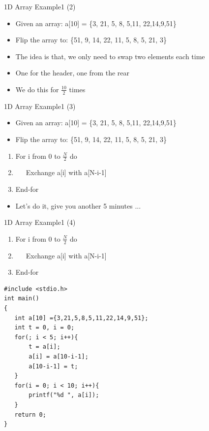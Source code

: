 \begin{frame}{1D Array Example1 (2)}
	\begin{itemize}
		\item {Given an array: a[10] = \{3, 21, 5, 8, 5,11, 22,14,9,51\}}
		\item {Flip the array to: \{51, 9, 14, 22, 11, 5, 8, 5, 21, 3\}}
	\end{itemize}
	\begin{itemize}
		\item {The idea is that, we only need to swap two elements each time}
		\item {One for the header, one from the rear}
		\item {We do this for $\frac{10}{2}$ times}
	\end{itemize}
\end{frame}

\begin{frame}{1D Array Example1 (3)}
	\begin{itemize}
		\item {Given an array: a[10] = \{3, 21, 5, 8, 5,11, 22,14,9,51\}}
		\item {Flip the array to: \{51, 9, 14, 22, 11, 5, 8, 5, 21, 3\}}
	\end{itemize}
	\begin{enumerate}
		\item {For i from 0 to $\frac{N}{2}$ do}
		\item {~~~Exchange a[i] with a[N-i-1]}
		\item {End-for}
	\end{enumerate}
	\begin{itemize}
		\item {Let's do it, give you another 5 minutes ...}
	\end{itemize}
\end{frame}

\begin{frame}[fragile]{1D Array Example1 (4)}
	\begin{enumerate}
		\item {For i from 0 to $\frac{N}{2}$ do}
		\item {~~~Exchange a[i] with a[N-i-1]}
		\item {End-for}
	\end{enumerate}
\begin{lstlisting}[xleftmargin=0.08\linewidth,linewidth=0.9\linewidth]
#include <stdio.h>
int main()
{
   int a[10] ={3,21,5,8,5,11,22,14,9,51};
   int t = 0, i = 0;
   for(; i < 5; i++){
       t = a[i];
       a[i] = a[10-i-1];
       a[10-i-1] = t;
   }
   for(i = 0; i < 10; i++){
       printf("%d ", a[i]);
   }
   return 0;
}
\end{lstlisting}
\end{frame}

